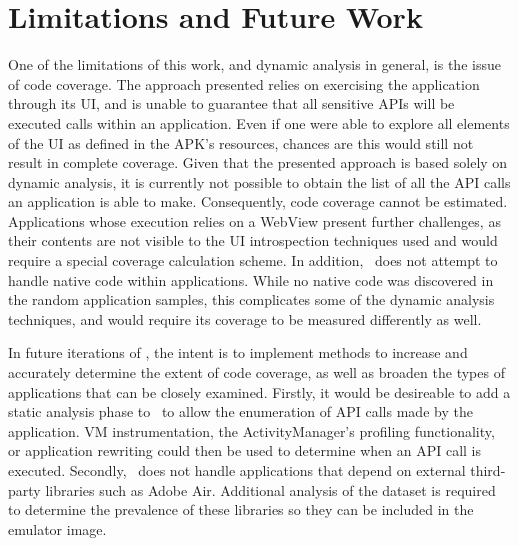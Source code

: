 \chapter{Limitations and Future Work}
\label{sec:future}

One of the limitations of this work, and dynamic analysis in general, is the issue of code coverage.  The approach presented relies on exercising the application through its UI, and is unable to guarantee that all sensitive APIs will be executed calls within an application. Even if one were able to explore all elements of the UI as defined in the APK's resources, chances are this would still not result in complete coverage.  Given that the presented approach is based solely on dynamic analysis, it is currently not possible to obtain the list of all the API calls an application is able to make. Consequently, code coverage cannot be estimated.  Applications whose execution relies on a WebView present further challenges, as their contents are not visible to the UI introspection techniques used and would require a special coverage calculation scheme.  In addition, \toolname~does not attempt to handle native code within applications.  While no native code was discovered in the random application samples, this complicates some of the dynamic analysis techniques, and would require its coverage to be measured differently as well.

In future iterations of \toolname, the intent is to implement methods to increase and accurately determine the extent of code coverage, as well as broaden the types of applications that can be closely examined.  Firstly, it would be desireable to add a static analysis phase to \toolname~to allow the enumeration of API calls made by the application.  VM instrumentation, the ActivityManager's profiling functionality, or application rewriting could then be used to determine when an API call is executed.  Secondly, \toolname~does not handle applications that depend on external third-party libraries such as Adobe Air.  Additional analysis of the dataset is required to determine the prevalence of these libraries so they can be included in the emulator image.  

